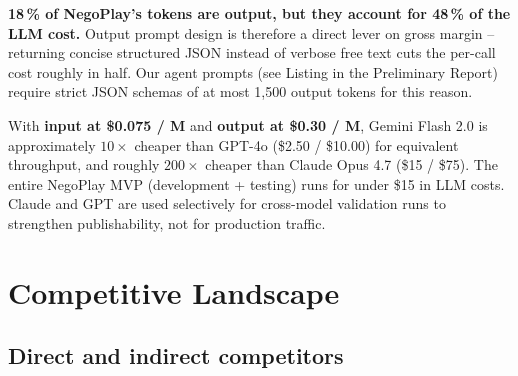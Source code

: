 \documentclass[11pt, a4paper, oneside]{report}
\begin{document}
\begin{keybox}
\textbf{18\,\% of NegoPlay's tokens are output, but they account for
48\,\% of the LLM cost.}
Output prompt design is therefore a direct lever on gross margin --
returning concise structured JSON instead of verbose free text cuts the
per-call cost roughly in half. Our agent prompts (see Listing in the
Preliminary Report) require strict JSON schemas of at most 1{,}500
output tokens for this reason.
\end{keybox}

\begin{keybox}
With \textbf{input at \$0.075 / M} and \textbf{output at \$0.30 / M},
Gemini Flash 2.0 is approximately $10\times$ cheaper than GPT-4o
(\$2.50 / \$10.00) for equivalent throughput, and roughly $200\times$
cheaper than Claude Opus 4.7 (\$15 / \$75). The entire NegoPlay MVP
(development + testing) runs for under \$15 in LLM costs.
Claude and GPT are used selectively for cross-model validation runs
to strengthen publishability, not for production traffic.
\end{keybox}

\chapter{Competitive Landscape}
\label{ch:competition}

\section{Direct and indirect competitors}
\end{document}
